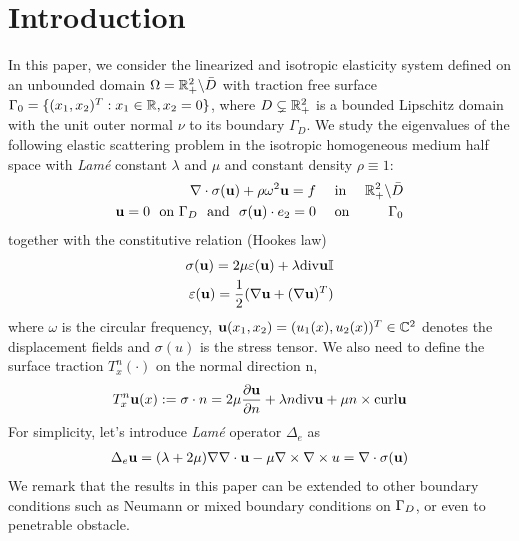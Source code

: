 \documentclass[12pt]{iopart}
\begin{document}
	\newcommand{\Np}{\mathcal{N}_p}
	\newcommand{\Ns}{\mathcal{N}_s}
	\newcommand{\Tp}{\mathcal{T}_p}
	\newcommand{\Ts}{\mathcal{T}_s}
	
	\newcommand{\be}{\begin{eqnarray}}
		\newcommand{\ee}{\end{eqnarray}}
	\newcommand{\ben}{\begin{eqnarray*}}
		\newcommand{\een}{\end{eqnarray*}}
	\newcommand{\nn}{\nonumber}
	

	
	\section{Introduction}\label{section1}
	In this paper, we consider the linearized and isotropic elasticity system defined on an unbounded domain $\Omega={\mathbb{R}}_+^2\backslash \bar{D}$ with traction free surface $\Gamma_0=\{(x_1,x_2)^T:x_1\in{\mathbb{R}},x_2=0\}$, where $D\subsetneq{\mathbb{R}}^2_+$ is a bounded Lipschitz domain with the unit outer normal $\nu$ to its boundary $\Gamma_D$.
	We study the eigenvalues of the  following elastic scattering problem in the isotropic homogeneous medium half space with \emph{Lam\'{e}} constant $\lambda$ and $\mu$ and constant density $\rho\equiv1$:
	\be\label{elastic_eq}
	\nabla\cdot\sigma(\u) + \rho\omega^2 \u= f \ \ \ \ &\mbox{in }& \R_+^2\bks \bar{D}\\ \label{elastic_bd}
	\u=0 \ \ \mbox{on} \ \Ga_D  \ \ \mbox{and} \ \ \sigma(\u)\cdot e_2=0 \  \ \ \ &\mbox{on}& \ \Ga_0
	\ee
	together with the constitutive relation (Hookes law)
	\ben
	\sigma(\u) = 2\mu\ep(\u) + \lambda\div \u \I \\
	\ep(\u)=\frac{1}{2}(\na \u +(\na \u)^T)
	\een
	where $\omega$ is the circular frequency, $\mathbf{u}(x_1,x_2)=(u_1(x),u_2(x))^T\in{\mathbb{C}}^2$ denotes the displacement fields and $\sigma(u)$ is the stress tensor. We also need to define the surface traction $T_x^n (\cdot)$ on the normal direction n,
	\ben
	T_x^n \u(x) := \sigma\cdot n = 2\mu\frac{\pa \u}{\pa n}+\lambda n\div \u + \mu n \times \curl \u
	\een
	For simplicity, let's introduce \emph{Lam\'{e}} operator $\Delta_e$ as
	\ben
	\Delta_e \u = (\lambda+2\mu)\nabla\nabla\cdot \u - \mu\nabla\times\nabla\times u=\nabla\cdot\sigma(\u)
	\een
	We remark that the results in
	this paper can be extended to other boundary
	conditions such as Neumann or mixed boundary conditions on $\Gamma_D$, or even to penetrable obstacle.
	
\end{document}
